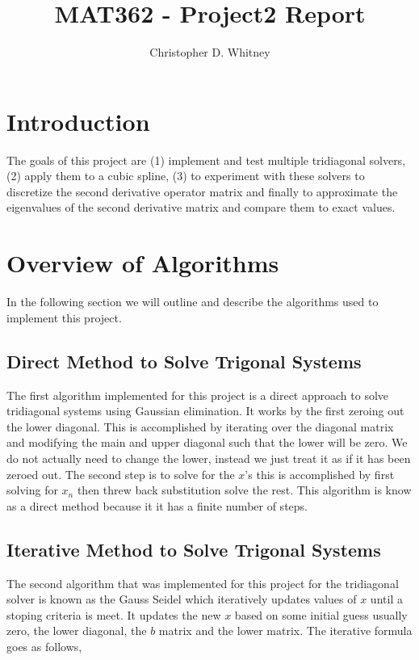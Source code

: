 \documentclass{article}
\begin{document}
\title{MAT362 - Project2 Report}
\author{Christopher D. Whitney}

\maketitle

\section*{Introduction}
The goals of this project are (1) implement and test multiple tridiagonal solvers, (2) apply them to a cubic spline, (3) to experiment with these solvers to discretize the second derivative operator matrix and finally to approximate the eigenvalues of the second derivative matrix and compare them to exact values. 

\section*{Overview of Algorithms}
In the following section we will outline and describe the algorithms used to implement this project. 

\subsection*{Direct Method to Solve Trigonal Systems}
The first algorithm implemented for this project is a direct approach to solve tridiagonal systems using Gaussian elimination. It works by the first zeroing out the lower diagonal. This is accomplished by iterating over the diagonal matrix and modifying the main and upper diagonal such that the lower will be zero. We do not actually need to change the lower, instead we just treat it as if it has been zeroed out. The second step is to solve for the $x$'s this is accomplished by first solving for $x_n$ then threw back substitution solve the rest. This algorithm is know as a direct method because it it has a finite number of steps.

\subsection*{Iterative Method to Solve Trigonal Systems}
The second algorithm that was implemented for this project for the tridiagonal solver is known as the Gauss Seidel which iteratively updates values of $x$ until a stoping criteria is meet. It updates the new $x$ based on some initial guess usually zero, the lower diagonal, the $b$ matrix and the lower matrix. The iterative formula goes as follows, 
\end{document}
